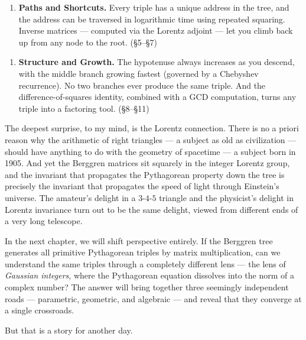 \documentclass[11pt,openany]{book}
\theoremstyle{definition}
\theoremstyle{plain}
\theoremstyle{remark}
\begin{document}
\begin{enumerate}
\item \textbf{Paths and Shortcuts.} Every triple has a unique address in the tree, and the address can be traversed in logarithmic time using repeated squaring. Inverse matrices — computed via the Lorentz adjoint — let you climb back up from any node to the root. (§5–§7)
\end{enumerate}

\begin{enumerate}
\item \textbf{Structure and Growth.} The hypotenuse always increases as you descend, with the middle branch growing fastest (governed by a Chebyshev recurrence). No two branches ever produce the same triple. And the difference-of-squares identity, combined with a GCD computation, turns any triple into a factoring tool. (§8–§11)
\end{enumerate}

The deepest surprise, to my mind, is the Lorentz connection. There is no a priori reason why the arithmetic of right triangles — a subject as old as civilization — should have anything to do with the geometry of spacetime — a subject born in 1905. And yet the Berggren matrices sit squarely in the integer Lorentz group, and the invariant that propagates the Pythagorean property down the tree is precisely the invariant that propagates the speed of light through Einstein's universe. The amateur's delight in a $3$-$4$-$5$ triangle and the physicist's delight in Lorentz invariance turn out to be the same delight, viewed from different ends of a very long telescope.

In the next chapter, we will shift perspective entirely. If the Berggren tree generates all primitive Pythagorean triples by matrix multiplication, can we understand the same triples through a completely different lens — the lens of \textit{Gaussian integers}, where the Pythagorean equation dissolves into the norm of a complex number? The answer will bring together three seemingly independent roads — parametric, geometric, and algebraic — and reveal that they converge at a single crossroads.

But that is a story for another day.
\end{document}
